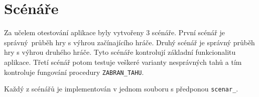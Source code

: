 \documentclass[11pt,a4paper,parskip=half-]{scrartcl}
\newcommand{\code}[1]{\texttt{#1}}
\begin{document}
\section{Scénáře}

Za učelem otestování aplikace byly vytvořeny 3 scénáře. První scénář je
správný průběh hry s výhrou začínajícího hráče. Druhý scénář je správný průběh
hry s výhrou druhého hráče. Tyto scénáře kontrolují základní funkcionalitu
aplikace. Třetí scénář potom testuje veškeré varianty nesprávných tahů a tím
kontroluje fungování procedury \code{ZABRAN\_TAHU}.

Každý z scénářů je implementován v jednom souboru s předponou \code{scenar\_}.
\end{document}
